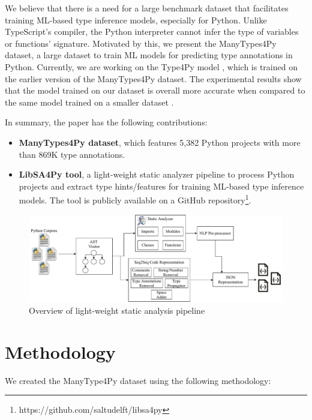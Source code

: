 \documentclass[10pt, conference]{IEEEtran}
\begin{document}
We believe that there is a need for a large benchmark dataset that facilitates training ML-based type inference models, especially for Python. Unlike TypeScript's compiler, the Python interpreter cannot infer the type of variables or functions' signature. Motivated by this, we present the ManyTypes4Py dataset, a large dataset to train ML models for predicting type annotations in Python. Currently, we are working on the Type4Py model \cite{mir2021type4py}, which is trained on the earlier version of the ManyTypes4Py dataset. The experimental results show that the model trained on our dataset is overall more accurate when compared to the same model trained on a smaller dataset \cite{mir2021type4py}.

In summary, the paper has the following contributions:
\begin{itemize}
	\item \textbf{ManyTypes4Py dataset}, which features 5,382 Python projects with more than 869K type annotations.
	\item \textbf{LibSA4Py tool}, a light-weight static analyzer pipeline to process Python projects and extract type hints/features for training ML-based type inference models. The tool is publicly available on a GitHub repository\footnote{https://github.com/saltudelft/libsa4py}.
\end{itemize}


\begin{figure}[!t]
	\centering
	\includegraphics[width=\linewidth]{figs/manytypes4py-pipeline.pdf}
	\caption{Overview of light-weight static analysis pipeline}
	\label{fig:overview-pipeline-sa}
\end{figure}

\section{Methodology}\label{sec:method}
We created the ManyType4Py dataset using the following methodology:
\end{document}

